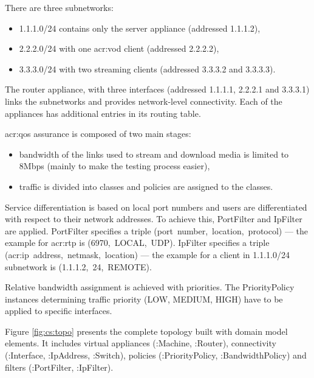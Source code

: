 \documentclass[11pt,openany]{book}
\begin{document}
        There are three subnetworks:

        \begin{itemize}
          \item 1.1.1.0/24 contains only the server appliance (addressed 1.1.1.2),
          \item 2.2.2.0/24 with one \gls{acr:vod} client (addressed 2.2.2.2),
          \item 3.3.3.0/24 with two streaming clients (addressed 3.3.3.2 and 3.3.3.3).
        \end{itemize}

        The router appliance, with three interfaces (addressed 1.1.1.1, 2.2.2.1 and 3.3.3.1) links the subnetworks and
        provides network-level connectivity. Each of the appliances has additional entries in its routing table.

        \gls{acr:qos} assurance is composed of two main stages:

        \begin{itemize}
          \item bandwidth of the links used to stream and download media is limited to 8Mbps (mainly to make the
                testing process easier),
          \item traffic is divided into classes and policies are assigned to the classes.
        \end{itemize}

        Service differentiation is based on local port numbers and users are differentiated with respect to their
        network addresses. To achieve this, PortFilter and IpFilter are applied. PortFilter specifies a triple
        \mbox{(port number, location, protocol)} --- the example for \gls{acr:rtp} is \mbox{(6970, LOCAL, UDP)}.
        IpFilter specifies a triple \mbox{(\gls{acr:ip} address, netmask, location)} --- the example for a client in
        1.1.1.0/24 subnetwork is \mbox{(1.1.1.2, 24, REMOTE)}.

        Relative bandwidth assignment is achieved with priorities. The PriorityPolicy instances determining traffic
        priority (LOW, MEDIUM, HIGH) have to be applied to specific interfaces.

        Figure \ref{fig:cs:topo} presents the complete topology built with domain model elements. It includes virtual
        appliances (:Machine, :Router), connectivity (:Interface, :IpAddress, :Switch), policies (:PriorityPolicy,
        :BandwidthPolicy) and filters (:PortFilter, :IpFilter).
\end{document}
